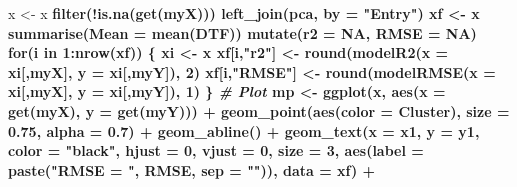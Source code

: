 \documentclass[
]{article}
\newenvironment{Shaded}{\begin{snugshade}}{\end{snugshade}}
\newcommand{\CommentTok}[1]{\textcolor[rgb]{0.56,0.35,0.01}{\textit{#1}}}
\newcommand{\ControlFlowTok}[1]{\textcolor[rgb]{0.13,0.29,0.53}{\textbf{#1}}}
\newcommand{\DataTypeTok}[1]{\textcolor[rgb]{0.13,0.29,0.53}{#1}}
\newcommand{\DecValTok}[1]{\textcolor[rgb]{0.00,0.00,0.81}{#1}}
\newcommand{\FloatTok}[1]{\textcolor[rgb]{0.00,0.00,0.81}{#1}}
\newcommand{\KeywordTok}[1]{\textcolor[rgb]{0.13,0.29,0.53}{\textbf{#1}}}
\newcommand{\NormalTok}[1]{#1}
\newcommand{\OperatorTok}[1]{\textcolor[rgb]{0.81,0.36,0.00}{\textbf{#1}}}
\newcommand{\OtherTok}[1]{\textcolor[rgb]{0.56,0.35,0.01}{#1}}
\newcommand{\StringTok}[1]{\textcolor[rgb]{0.31,0.60,0.02}{#1}}
\begin{document}
\begin{Shaded}
\begin{Highlighting}[]
{{{{{\NormalTok{  x <-}\StringTok{ }\NormalTok{x }\OperatorTok{%
\StringTok{    }\KeywordTok{filter}\NormalTok{(}\OperatorTok{!}\KeywordTok{is.na}\NormalTok{(}\KeywordTok{get}\NormalTok{(myX))) }\OperatorTok{%
\StringTok{    }\KeywordTok{left_join}\NormalTok{(pca, }\DataTypeTok{by =} \StringTok{"Entry"}\NormalTok{)}
\NormalTok{  xf <-}\StringTok{ }\NormalTok{x }\OperatorTok{%
\StringTok{    }\KeywordTok{summarise}\NormalTok{(}\DataTypeTok{Mean =} \KeywordTok{mean}\NormalTok{(DTF)) }\OperatorTok{%
\StringTok{    }\KeywordTok{mutate}\NormalTok{(}\DataTypeTok{r2 =} \OtherTok{NA}\NormalTok{, }\DataTypeTok{RMSE =} \OtherTok{NA}\NormalTok{)}
  \ControlFlowTok{for}\NormalTok{(i }\ControlFlowTok{in} \DecValTok{1}\OperatorTok{:}\KeywordTok{nrow}\NormalTok{(xf)) \{}
\NormalTok{    xi <-}\StringTok{ }\NormalTok{x }\OperatorTok{%
\NormalTok{    xf[i,}\StringTok{"r2"}\NormalTok{]   <-}\StringTok{ }\KeywordTok{round}\NormalTok{(}\KeywordTok{modelR2}\NormalTok{(}\DataTypeTok{x =}\NormalTok{ xi[,myX],   }\DataTypeTok{y =}\NormalTok{ xi[,myY]), }\DecValTok{2}\NormalTok{)}
\NormalTok{    xf[i,}\StringTok{"RMSE"}\NormalTok{] <-}\StringTok{ }\KeywordTok{round}\NormalTok{(}\KeywordTok{modelRMSE}\NormalTok{(}\DataTypeTok{x =}\NormalTok{ xi[,myX], }\DataTypeTok{y =}\NormalTok{ xi[,myY]), }\DecValTok{1}\NormalTok{)}
\NormalTok{  \}}
  \CommentTok{# Plot}
\NormalTok{  mp <-}\StringTok{ }\KeywordTok{ggplot}\NormalTok{(x, }\KeywordTok{aes}\NormalTok{(}\DataTypeTok{x =} \KeywordTok{get}\NormalTok{(myX), }\DataTypeTok{y =} \KeywordTok{get}\NormalTok{(myY))) }\OperatorTok{+}
\StringTok{    }\KeywordTok{geom_point}\NormalTok{(}\KeywordTok{aes}\NormalTok{(}\DataTypeTok{color =}\NormalTok{ Cluster), }\DataTypeTok{size =} \FloatTok{0.75}\NormalTok{, }\DataTypeTok{alpha =} \FloatTok{0.7}\NormalTok{) }\OperatorTok{+}\StringTok{ }\KeywordTok{geom_abline}\NormalTok{() }\OperatorTok{+}
\StringTok{    }\KeywordTok{geom_text}\NormalTok{(}\DataTypeTok{x =}\NormalTok{ x1, }\DataTypeTok{y =}\NormalTok{ y1, }\DataTypeTok{color =} \StringTok{"black"}\NormalTok{, }\DataTypeTok{hjust =} \DecValTok{0}\NormalTok{, }\DataTypeTok{vjust =} \DecValTok{0}\NormalTok{, }\DataTypeTok{size =} \DecValTok{3}\NormalTok{,}
              \KeywordTok{aes}\NormalTok{(}\DataTypeTok{label =} \KeywordTok{paste}\NormalTok{(}\StringTok{"RMSE = "}\NormalTok{, RMSE, }\DataTypeTok{sep =} \StringTok{""}\NormalTok{)), }\DataTypeTok{data =}\NormalTok{ xf) }\OperatorTok{+}
}}}}}}}}}}
\end{Highlighting}
\end{Shaded}
\end{document}
